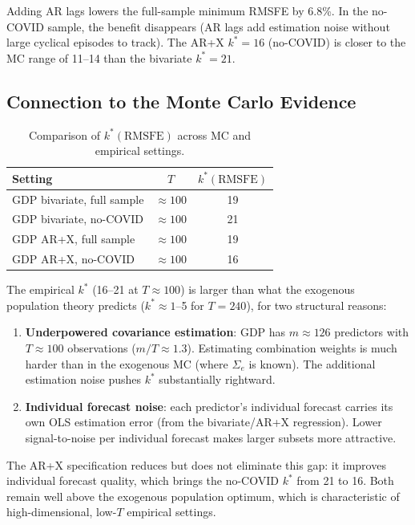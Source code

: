 \documentclass[12pt,a4paper]{article}
\begin{document}
Adding AR lags lowers the full-sample minimum RMSFE by 6.8\%. In the
no-COVID sample, the benefit disappears (AR lags add estimation noise
without large cyclical episodes to track). The AR+X $k^*=16$ (no-COVID)
is closer to the MC range of 11--14 than the bivariate $k^*=21$.

\subsection{Connection to the Monte Carlo Evidence}

\begin{table}[h]
\centering
\caption{Comparison of $k^*(\text{RMSFE})$ across MC and empirical settings.}
\label{tab:kstar_compare}
\begin{tabular}{lcc}
\toprule
Setting & $T$ & $k^*(\text{RMSFE})$ \\
\midrule
GDP bivariate, full sample  & $\approx 100$ & 19 \\
GDP bivariate, no-COVID     & $\approx 100$ & 21 \\
GDP AR+X, full sample       & $\approx 100$ & 19 \\
GDP AR+X, no-COVID          & $\approx 100$ & 16 \\
\bottomrule
\end{tabular}
\end{table}

The empirical $k^*$ (16--21 at $T \approx 100$) is larger than what the
exogenous population theory predicts ($k^* \approx 1$--5 for $T=240$),
for two structural reasons:

\begin{enumerate}
\item \textbf{Underpowered covariance estimation}: GDP has
  $m \approx 126$ predictors with $T \approx 100$ observations
  ($m/T \approx 1.3$). Estimating combination weights is much harder
  than in the exogenous MC (where $\Sigma_e$ is known). The additional
  estimation noise pushes $k^*$ substantially rightward.
\item \textbf{Individual forecast noise}: each predictor's individual
  forecast carries its own OLS estimation error (from the
  bivariate/AR+X regression). Lower signal-to-noise per individual
  forecast makes larger subsets more attractive.
\end{enumerate}

The AR+X specification reduces but does not eliminate this gap: it
improves individual forecast quality, which brings the no-COVID $k^*$
from 21 to 16. Both remain well above the exogenous population optimum,
which is characteristic of high-dimensional, low-$T$ empirical settings.
\end{document}
